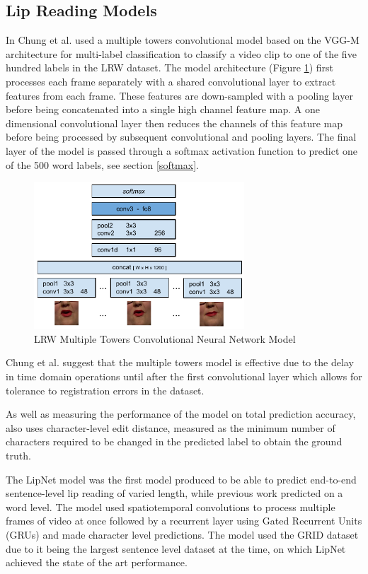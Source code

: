 \subsection{Lip Reading Models}
In \cite{Chung2016} Chung et al. used a multiple towers convolutional model based on the VGG-M architecture for multi-label classification to classify a video clip to one of the five hundred labels in the LRW dataset.
The model architecture (Figure \ref{fig:LRW_Multiple_Towers}) first processes each frame separately with a shared convolutional layer to extract features from each frame.
These features are down-sampled with a pooling layer before being concatenated into a single high channel feature map.
A one dimensional convolutional layer then reduces the channels of this feature map before being processed by subsequent convolutional and pooling layers.
The final layer of the model is passed through a softmax activation function to predict one of the 500 word labels, see section \ref{softmax}.

\begin{figure}[h]
    \centering
        \includegraphics[width=0.7\textwidth]{figures/lrw_multiple_towers.png}
    \caption{LRW Multiple Towers Convolutional Neural Network Model \cite{Chung2016}}\label{fig:LRW_Multiple_Towers}
\end{figure}

Chung et al. suggest that the multiple towers model is effective due to the delay in time domain operations until after the first convolutional layer which allows for tolerance to registration errors in the dataset.

As well as measuring the performance of the model on total prediction accuracy, \cite{Chung2016} also uses character-level edit distance, measured as the minimum number of characters required to be changed in the predicted label to obtain the ground truth.

The LipNet model \cite{Assael2016} was the first model produced to be able to predict end-to-end sentence-level lip reading of varied length, while previous work predicted on a word level.
The model used spatiotemporal convolutions to process multiple frames of video at once followed by a recurrent layer using Gated Recurrent Units (GRUs) \cite{Cho2014} and made character level predictions.
The model used the GRID dataset \cite{Cooke2006} due to it being the largest sentence level dataset at the time, on which LipNet achieved the state of the art performance.

